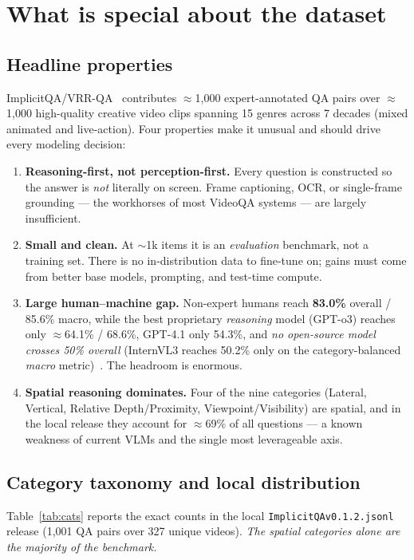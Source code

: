 \documentclass[11pt]{article}
\newcommand{\best}[1]{\textbf{#1}}
\begin{document}
\section{What is special about the dataset}
\subsection{Headline properties}
ImplicitQA/VRR-QA~\cite{implicitqa} contributes $\approx$1{,}000 expert-annotated
QA pairs over $\approx$1{,}000 high-quality creative video clips spanning 15
genres across 7 decades (mixed animated and live-action). Four properties make it
unusual and should drive every modeling decision:

\begin{enumerate}[leftmargin=1.4em,itemsep=2pt]
  \item \textbf{Reasoning-first, not perception-first.} Every question is
  constructed so the answer is \emph{not} literally on screen. Frame captioning,
  OCR, or single-frame grounding --- the workhorses of most VideoQA systems ---
  are largely insufficient.
  \item \textbf{Small and clean.} At $\sim$1k items it is an \emph{evaluation}
  benchmark, not a training set. There is no in-distribution data to fine-tune on;
  gains must come from better base models, prompting, and test-time compute.
  \item \textbf{Large human--machine gap.} Non-expert humans reach \best{83.0\%}
  overall / 85.6\% macro, while the best proprietary \emph{reasoning} model
  (GPT-o3) reaches only $\approx$64.1\% / 68.6\%, GPT-4.1 only 54.3\%, and
  \emph{no open-source model crosses 50\% overall} (InternVL3 reaches 50.2\% only
  on the category-balanced \emph{macro} metric)~\cite{implicitqa}. The headroom is
  enormous.
  \item \textbf{Spatial reasoning dominates.} Four of the nine categories
  (Lateral, Vertical, Relative Depth/Proximity, Viewpoint/Visibility) are spatial,
  and in the local release they account for $\approx$69\% of all questions --- a
  known weakness of current VLMs and the single most leverageable axis.
\end{enumerate}

\subsection{Category taxonomy and local distribution}
Table~\ref{tab:cats} reports the exact counts in the local
\texttt{ImplicitQAv0.1.2.jsonl} release (1{,}001 QA pairs over 327 unique videos).
\emph{The spatial categories alone are the majority of the benchmark.}
\end{document}
